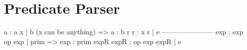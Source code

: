 \section{Predicate  Parser}


  \begin{bluetext}
    a : a x | b (x can be anything)
    =>
    a : b r
    r : x r | e
    -----------------------
    exp : exp op exp | prim
    =>
    exp : prim expR
    expR : op exp expR | e 
  \end{bluetext}
